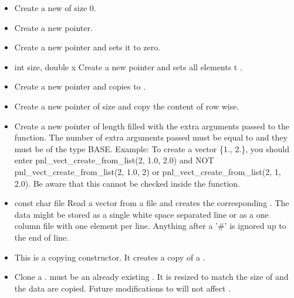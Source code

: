 \begin{itemize}
  \item {}
  \sshortdescribe Create a new \PnlVect of size 0.  
\item {}
  \sshortdescribe Create a new \PnlVect pointer.  
\item {}
  \sshortdescribe Create a new \PnlVect pointer and sets it to zero.  
\item {}
  {int size, double x}
  \sshortdescribe Create a new \PnlVect pointer and sets all
  elements t .  
\item {}
  \sshortdescribe Create a new \PnlVect pointer and copies 
  to .  
\item {}
  \sshortdescribe Create a new \PnlVect pointer of size 
  and copy the content of  row wise.
\item {}
  \sshortdescribe Create a new \PnlVect pointer of length
   filled with the extra arguments passed to the function. The
  number of extra arguments passed must be equal to  and they must be of the type BASE.
  Example: To create a vector \{1., 2.\}, you should enter pnl_vect_create_from_list(2, 1.0, 2.0) and NOT pnl_vect_create_from_list(2, 1.0, 2) or pnl_vect_create_from_list(2, 1, 2.0).
  Be aware that this cannot be checked inside the function.
\item {}
  {const char \ptr file}
  \sshortdescribe Read a vector from a file and creates the corresponding
  \PnlVect. The data might be stored as a single white space separated line
  or as a one column file with one element per line. Anything after a '\#' is ignored up to
  the end of line.

\item {}
  \sshortdescribe This is a copying constructor. It creates a copy of a \PnlVect.
\item {} 
  \sshortdescribe Clone a \PnlVect.  must be an
  already existing  \PnlVect. It is resized to match the size of
   and the data are copied. Future modifications to  will not
  affect .


\end{itemize}
